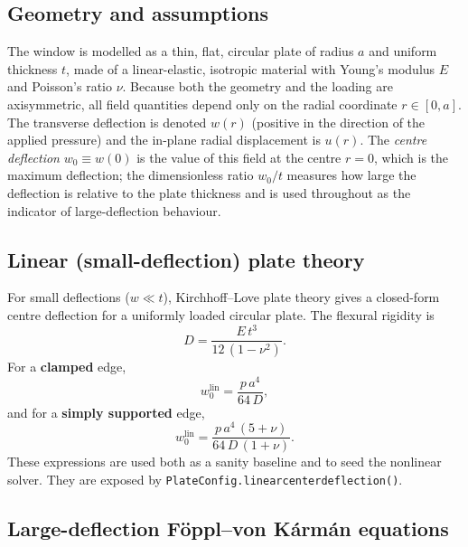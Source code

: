\documentclass[11pt]{article}
\newcommand{\codeus}{\textunderscore\allowbreak}
\DeclareRobustCommand{\code}[1]{\texttt{\ifmmode\else\renewcommand{\_}{\codeus}\fi#1}}
\begin{document}
\subsection{Geometry and assumptions}

The window is modelled as a thin, flat, circular plate of radius $a$ and uniform
thickness $t$, made of a linear-elastic, isotropic material with Young's modulus
$E$ and Poisson's ratio $\nu$. Because both the geometry and the loading are
axisymmetric, all field quantities depend only on the radial coordinate
$r \in [0, a]$. The transverse deflection is denoted $w(r)$ (positive in the
direction of the applied pressure) and the in-plane radial displacement is
$u(r)$. The \emph{centre deflection} $w_{0} \equiv w(0)$ is the value of this
field at the centre $r = 0$, which is the maximum deflection; the dimensionless
ratio $w_{0}/t$ measures how large the deflection is relative to the plate
thickness and is used throughout as the indicator of large-deflection behaviour.

\subsection{Linear (small-deflection) plate theory}
\label{sec:linear}

For small deflections ($w \ll t$), Kirchhoff--Love plate theory gives a closed-form
centre deflection for a uniformly loaded circular plate. The flexural rigidity is
%
\begin{equation}
  D = \frac{E\,t^{3}}{12\,(1-\nu^{2})}.
\end{equation}
%
For a \textbf{clamped} edge,
%
\begin{equation}
  w_{0}^{\text{lin}} = \frac{p\,a^{4}}{64\,D},
  \label{eq:clamped-linear}
\end{equation}
%
and for a \textbf{simply supported} edge,
%
\begin{equation}
  w_{0}^{\text{lin}} = \frac{p\,a^{4}\,(5+\nu)}{64\,D\,(1+\nu)}.
  \label{eq:ss-linear}
\end{equation}
%
These expressions are used both as a sanity baseline and to seed the nonlinear
solver. They are exposed by \code{PlateConfig.linear\_center\_deflection()}.

\subsection{Large-deflection F\"oppl--von K\'arm\'an equations}
\end{document}
